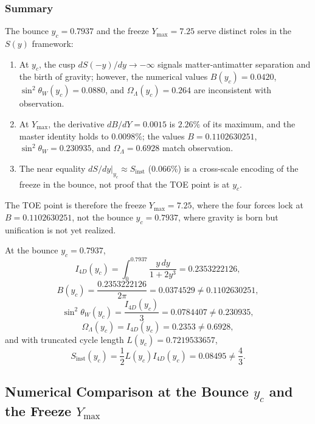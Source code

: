 \documentclass[a4paper,1pt,oneside,openany]{book}
\begin{document}
\subsubsection{Summary}

The bounce $y_c = 0.7937$ and the freeze $Y_{\max} = 7.25$ serve distinct roles in the $S(y)$ framework:
\begin{enumerate}
\item At $y_c$, the cusp $dS(-y)/dy \to -\infty$ signals matter-antimatter separation and the birth of gravity; however, the numerical values $B(y_c) = 0.0420$, $\sin^2\theta_W(y_c) = 0.0880$, and $\Omega_\Lambda(y_c) = 0.264$ are inconsistent with observation.
\item At $Y_{\max}$, the derivative $dB/dY = 0.0015$ is $2.26\%$ of its maximum, and the master identity holds to $0.0098\%$; the values $B = 0.1102630251$, $\sin^2\theta_W = 0.230935$, and $\Omega_\Lambda = 0.6928$ match observation.
\item The near equality $dS/dy|_{y_c} \approx S_{\mathrm{inst}}$ (0.066\%) is a cross-scale encoding of the freeze in the bounce, not proof that the TOE point is at $y_c$.
\end{enumerate}
The TOE point is therefore the freeze $Y_{\max} = 7.25$, where the four forces lock at $B = 0.1102630251$, not the bounce $y_c = 0.7937$, where gravity is born but unification is not yet realized.

At the bounce $y_c = 0.7937$,
\begin{equation}
I_{4D}(y_c) = \int_0^{0.7937} \frac{y\,dy}{1 + 2y^3} = 0.2353222126,
\label{eq:I4D-yc}
\end{equation}
\begin{equation}
B(y_c) = \frac{0.2353222126}{2\pi} = 0.0374529 \neq 0.1102630251,
\label{eq:B-yc}
\end{equation}
\begin{equation}
\sin^2\theta_W(y_c) = \frac{I_{4D}(y_c)}{3} = 0.0784407 \neq 0.230935,
\label{eq:sin2-yc}
\end{equation}
\begin{equation}
\Omega_\Lambda(y_c) = I_{4D}(y_c) = 0.2353 \neq 0.6928,
\label{eq:OmegaL-yc}
\end{equation}
and with truncated cycle length $L(y_c) = 0.7219533657$,
\begin{equation}
S_{\mathrm{inst}}(y_c) = \frac{1}{2}L(y_c)I_{4D}(y_c) = 0.08495 \neq \frac{4}{3}.
\label{eq:Sinst-yc}
\end{equation}

\subsection{Numerical Comparison at the Bounce $y_c$ and the Freeze $Y_{\max}$}
\label{sec:numerical-comparison-table}
\end{document}
